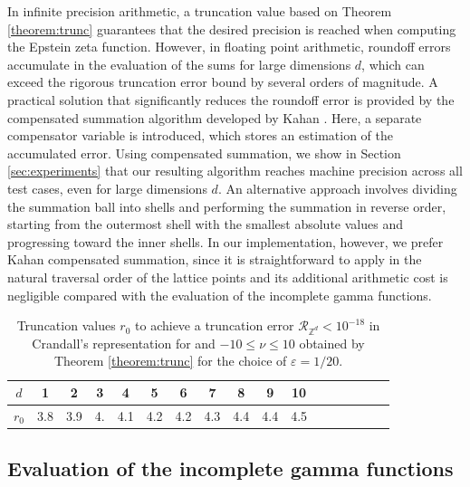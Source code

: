 \documentclass[]{amsart}
\newcommand{\new}[1]{#1}
\numberwithin{mythm}{section}
\begin{document}
In infinite precision arithmetic, a truncation value based on 
Theorem \ref{theorem:trunc} guarantees that the desired precision is reached when computing the Epstein zeta function.  However, in floating point arithmetic, roundoff errors accumulate in the evaluation of the sums for large dimensions $d$, which can exceed the rigorous truncation error bound by several orders of magnitude. A practical solution that significantly reduces the roundoff error is provided by the compensated summation algorithm developed by Kahan \cite{kahan}. Here, a separate compensator variable is introduced, which stores an estimation of the accumulated error. Using compensated summation, we show in 
Section \ref{sec:experiments} that our resulting algorithm reaches machine precision across all test cases, even for large dimensions $d$. \new{An alternative approach involves dividing the summation ball into shells and performing the summation in reverse order, starting from the outermost shell with the smallest absolute values and progressing toward the inner shells. In our implementation, however, we prefer Kahan compensated summation, since it is straightforward to apply in the natural traversal order of the lattice points and its additional arithmetic cost is negligible compared with the evaluation of the incomplete gamma functions.}

\begin{table}
\centering
\begin{tabular}{c | *{16}{c}}
\toprule
$d$ & 1 & 2 & 3 & 4 & 5 & 6 & 7 & 8 & 9 & 10  \\
\midrule
$r_0$  &3.8 &3.9 &4. &4.1 &4.2 &4.2 &4.3 &4.4 &4.4 &4.5 \\
\bottomrule
\end{tabular}
\caption{Truncation values \(r_0\) to achieve a truncation error $\mathcal R_{\mathds Z^{d}}<10^{-18}$ in Crandall's representation for and $-10\le \nu\le 10$ 
obtained by 
Theorem \ref{theorem:trunc} for the choice of $\varepsilon = 1/20$.}
\label{tab:square-lattice-trunc-values}
\end{table}



\subsection{Evaluation of the incomplete gamma functions}
\label{sec:ogammaalg}
\end{document}
